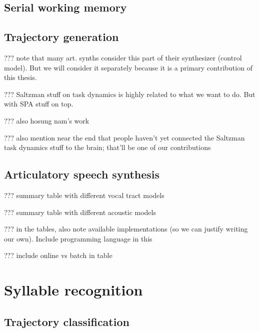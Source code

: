 \subsection{Serial working memory}

\subsection{Trajectory generation}

??? note that many art. synths consider this part of their
synthesizer (control model).
But we will consider it separately because
it is a primary contribution of this thesis.

??? Saltzman stuff on task dynamics
is highly related to what we want to do.
But with SPA stuff on top.

??? also hosung nam's work

??? also mention near the end that people haven't
yet connected the Saltzman task dynamics stuff
to the brain; that'll be one of our contributions

\subsection{Articulatory speech synthesis}

??? summary table with different vocal tract models

??? summary table with different acoustic models

??? in the tables, also note available implementations
(so we can justify writing our own).
Include programming language in this

??? include online vs batch in table

\section{Syllable recognition}

\subsection{Trajectory classification}

